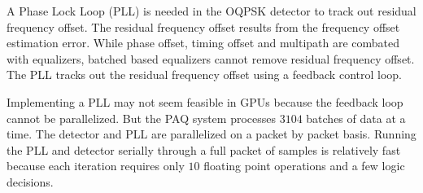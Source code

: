 A Phase Lock Loop (PLL) is needed in the OQPSK detector to track out residual frequency offset.
The residual frequency offset results from the frequency offset estimation error.
While phase offset, timing offset and multipath are combated with equalizers, batched based equalizers cannot remove residual frequency offset.
The PLL tracks out the residual frequency offset using a feedback control loop.

Implementing a PLL may not seem feasible in GPUs because the feedback loop cannot be parallelized.
But the PAQ system processes $3104$ batches of data at a time.
The detector and PLL are parallelized on a packet by packet basis.
Running the PLL and detector serially through a full packet of samples is relatively fast because each iteration requires only $10$ floating point operations and a few logic decisions.